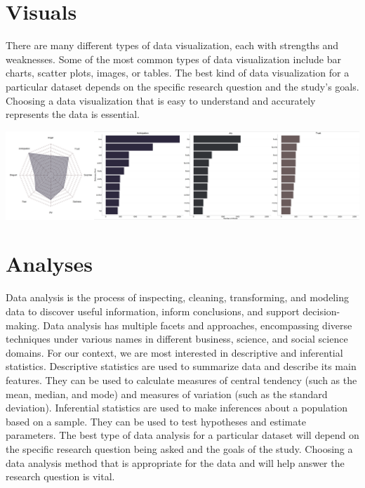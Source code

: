 \documentclass[
  b5paper]{book}
\begin{document}
\hypertarget{visuals}{%
\section*{Visuals}\label{visuals}}

There are many different types of data visualization, each with strengths and weaknesses. Some of the most common types of data visualization include bar charts, scatter plots, images, or tables. The best kind of data visualization for a particular dataset depends on the specific research question and the study's goals. Choosing a data visualization that is easy to understand and accurately represents the data is essential.

\includegraphics[width=1\textwidth,height=\textheight]{images/VR-Play-Emotion-MP.png}

\hypertarget{analyses}{%
\section*{Analyses}\label{analyses}}

Data analysis is the process of inspecting, cleaning, transforming, and modeling data to discover useful information, inform conclusions, and support decision-making. Data analysis has multiple facets and approaches, encompassing diverse techniques under various names in different business, science, and social science domains. For our context, we are most interested in descriptive and inferential statistics. Descriptive statistics are used to summarize data and describe its main features. They can be used to calculate measures of central tendency (such as the mean, median, and mode) and measures of variation (such as the standard deviation). Inferential statistics are used to make inferences about a population based on a sample. They can be used to test hypotheses and estimate parameters. The best type of data analysis for a particular dataset will depend on the specific research question being asked and the goals of the study. Choosing a data analysis method that is appropriate for the data and will help answer the research question is vital.
\end{document}
